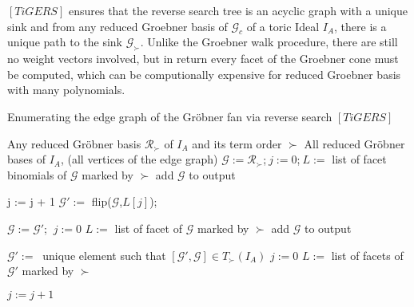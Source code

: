 \newpage

$[TiGERS] $ ensures that the reverse search tree is an acyclic graph with a unique sink and from any reduced Groebner basis of $\mathcal{G}_{c} $ of a toric Ideal $I_{A}$, there is a unique path to the sink $\mathcal{G}_{\succ} $.
Unlike the Groebner walk procedure, there are still no weight vectors involved, but in return every facet of the Groebner cone must be computed, which can be computionally expensive for reduced Groebner basis with many polynomials.

\begin{algorithm}
\caption{Enumerating the edge graph of the Gröbner fan via reverse search $\left[ TiGERS\right]  $}
\label{alg:reverse}
\begin{algorithmic}[1]

\Require
Any reduced Gröbner basis $ \mathcal{R}_{\succ} $ of $I_A$ and its term order $\succ$
\Ensure All reduced Gröbner bases of $I_A$, (all vertices of the edge graph)
\State $\mathcal{G} := \mathcal{R}_{\succ}$;$~j := 0$;$~L := $ list of facet binomials of $\mathcal{G}$ marked by $\succ$
\State add $\mathcal{G}$ to output
\Repeat
{}

\State j := j + 1
\State $\mathcal{G}':= $ flip($\mathcal{G}$,$L[j]$);

\State $\mathcal{G} := \mathcal{G}' $;   $~j := 0$
\State $ L := $ list of facet of $\mathcal{G}$ marked by $\succ$
\State add $ \mathcal{G}$ to output

\EndIf 

\EndWhile

\State $\mathcal{G}' :=~$ unique element such that $[\mathcal{G}',\mathcal{G}] \in T_{\succ}(I_{A}) $
\State $j := 0$
\State $L := $ list of facets of $\mathcal{G}'$ marked by $\succ$

\Repeat
\State $j := j + 1$

\EndIf



\end{algorithmic}
\end{algorithm}

\newpage

